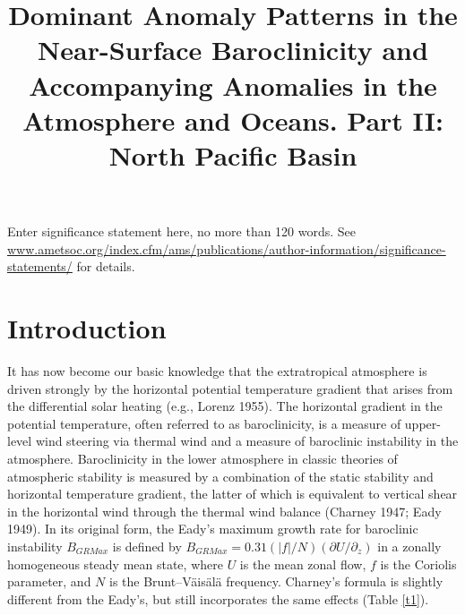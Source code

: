 \documentclass{ametsocv6.1}
\title{Dominant Anomaly Patterns in the Near-Surface 
Baroclinicity and Accompanying
Anomalies in the Atmosphere and Oceans. 
Part II: North Pacific Basin}
\affiliation{\aff{a}Japan Agency for Marine-Earth Science and Technology, Yokohama,
Kanagawa, Japan}
\begin{document}
\maketitle

%
%
%
\statement
	 Enter significance statement here, no more than 120 words. See \url{www.ametsoc.org/index.cfm/ams/publications/author-information/significance-statements/} for details.
%
%

%

\section{Introduction}

It has now become our basic
knowledge that the extratropical
atmosphere is driven strongly by the horizontal
potential temperature gradient that arises from the
differential solar heating (e.g., Lorenz 1955). The horizontal
gradient in the potential temperature, often referred
to as baroclinicity, is a measure of upper-level wind
steering via thermal wind and a measure of baroclinic
instability in the atmosphere. Baroclinicity in the lower
atmosphere in classic theories of atmospheric stability is
measured by a combination of the static stability and
horizontal temperature gradient, the latter of which is
equivalent to vertical shear in the horizontal wind through
the thermal wind balance (Charney 1947; Eady 1949). In
its original form, the Eady's maximum growth rate for
baroclinic instability $B_{GRMax}$ is defined by $B_{GRMax} =
0.31(|f|/N)(\partial U/\partial_z)$ in a zonally homogeneous steady
mean state, where $U$ is the mean zonal flow, $f$ is the
Coriolis parameter, and $N$ is the Brunt--V\"ais\"al\"a frequency.
Charney's formula is slightly different from the Eady's,
but still incorporates the same effects (Table \ref{t1}).
\end{document}
